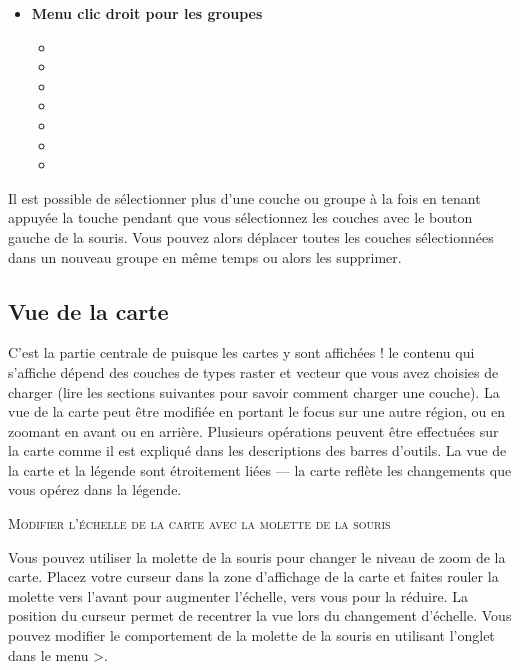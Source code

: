 \begin{itemize}[label=--]
\item \textbf{Menu clic droit pour les groupes} 
\begin{itemize}[label=--]
\item {}
\item {}
\item {}
\item {}
\item {}
\item {}
\item {}
\end{itemize}

\end{itemize}

Il est possible de sélectionner plus d'une couche ou groupe à la fois en tenant 
appuyée la touche   pendant que vous sélectionnez les couches 
avec le bouton gauche de la souris. Vous pouvez alors déplacer toutes les couches 
sélectionnées dans un nouveau groupe en même temps ou alors les supprimer.

\subsection{Vue de la carte} \label{label_mapview}

C'est la partie centrale de \qg puisque les cartes y sont affichées ! le contenu qui s'affiche dépend des couches de types raster et vecteur que vous avez choisies de charger (lire les sections suivantes pour savoir comment charger une couche). La vue de la carte peut être modifiée en portant le focus sur une autre région, ou en zoomant en avant ou en arrière. Plusieurs opérations peuvent être effectuées sur la carte comme il est expliqué dans les descriptions des barres d'outils. La vue de la carte et la légende sont étroitement liées — la carte reflète les changements que vous opérez dans la légende.

\begin{Tip} \caption{\textsc{Modifier l'échelle de la carte avec la molette de la souris} }
Vous pouvez utiliser la molette de la souris pour changer le niveau de zoom de la carte. Placez votre curseur dans la zone d'affichage de la carte et faites rouler la molette vers l'avant pour augmenter l'échelle, vers vous pour la réduire. La position du curseur permet de recentrer la vue lors du changement d'échelle. Vous pouvez modifier le comportement de la molette de la souris en utilisant l'onglet  dans le menu  >.
\end{Tip}

